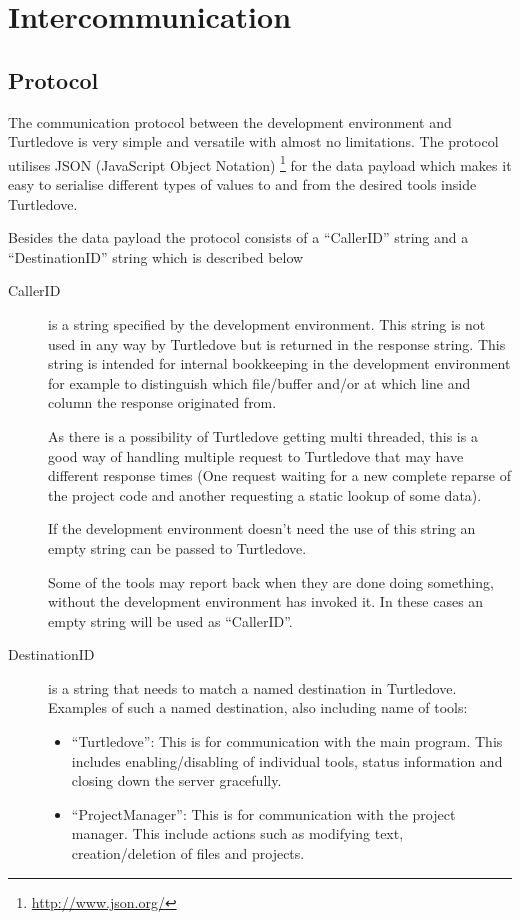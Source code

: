 \section*{Intercommunication}


\subsection*{Protocol}


The communication protocol between the development environment and Turtledove is
very simple and versatile with almost no limitations. The protocol utilises JSON
(JavaScript Object Notation) \footnote{\url{http://www.json.org/}} for the data
payload which makes it easy to serialise different types of values to and from
the desired tools inside Turtledove.

Besides the data payload the protocol consists of a ``CallerID'' string and a
``DestinationID'' string which is described below

\begin{description}
\item[CallerID] is a string specified by the development environment. This
  string is not used in any way by Turtledove but is returned in the response
  string. This string is intended for internal bookkeeping in the development
  environment for example to distinguish which file/buffer and/or at which line
  and column the response originated from.

  As there is a possibility of Turtledove getting multi threaded, this is a good
  way of handling multiple request to Turtledove that may have different
  response times (One request waiting for a new complete reparse of the project
  code and another requesting a static lookup of some data).

  If the development environment doesn't need the use of this string an empty
  string can be passed to Turtledove.

  Some of the tools may report back when they are done doing something, without
  the development environment has invoked it. In these cases an empty string
  will be used as ``CallerID''.

\item[DestinationID] is a string that needs to match a named destination in
  Turtledove. Examples of such a named destination, also including name of
  tools:

  \begin{itemize}
  \item ``Turtledove'': This is for communication with the main program. This
    includes enabling/disabling of individual tools, status information and
    closing down the server gracefully.

  \item ``ProjectManager'': This is for communication with the project
    manager. This include actions such as modifying text, creation/deletion of
    files and projects.
  \end{itemize}
\end{description}



